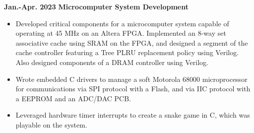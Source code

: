 \documentclass[11pt,a4paper,sans]{moderncv}
\begin{document}
\cventry
{\textnormal{\textbf{Jan.-Apr. 2023}}}
{\textnormal{\textbf{Microcomputer System Development}}}
{}{}{}
{
    \begin{itemize}
    \item Developed critical components for a microcomputer system capable of operating at 45 MHz on an Altera FPGA. Implemented an 8-way set associative cache using SRAM on the FPGA, and designed a segment of the cache controller featuring a Tree PLRU replacement policy using Verilog. Also designed components of a DRAM controller using Verilog.
    \item Wrote embedded C drivers to manage a soft Motorola 68000 microprocessor for communications via SPI protocol with a Flash, and via IIC protocol with a EEPROM and an ADC/DAC PCB.
    \item Leveraged hardware timer interrupts to create a snake game in C, which was playable on the system.
    \end{itemize}
}


\end{document}

